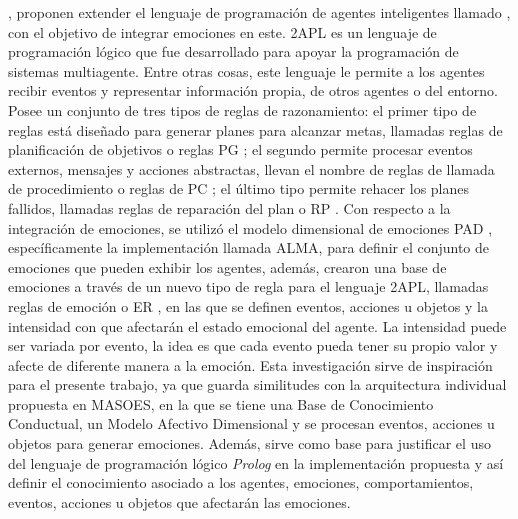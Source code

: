 \cite{dastani2014programming}, proponen extender el lenguaje de programación de agentes inteligentes llamado ,
con el objetivo de integrar emociones en este.
2APL es un lenguaje de programación lógico que fue desarrollado para apoyar la programación de sistemas multiagente.
Entre otras cosas, este lenguaje le permite a los agentes recibir eventos y representar información
propia, de otros agentes o del entorno.
Posee un conjunto de tres tipos de reglas de razonamiento:
el primer tipo de reglas está diseñado para generar planes para alcanzar metas,
llamadas reglas de planificación de objetivos o reglas PG ;
el segundo permite procesar eventos externos, mensajes y acciones abstractas,
llevan el nombre de reglas de llamada de procedimiento o reglas de PC ;
el último tipo permite rehacer los planes fallidos,
llamadas reglas de reparación del plan o RP .
Con respecto a la integración de emociones, se utilizó
el modelo dimensional de emociones PAD ,
específicamente la implementación llamada ALMA, para definir
el conjunto de emociones que pueden exhibir los agentes, además,
crearon una base de emociones a través de un nuevo tipo de regla para el lenguaje 2APL,
llamadas reglas de emoción o ER , en las que se definen eventos, acciones u objetos
y la intensidad con que afectarán el estado emocional del agente.
La intensidad puede ser variada por evento,
la idea es que cada evento pueda tener su propio valor
y afecte de diferente manera a la emoción.
Esta investigación sirve de inspiración para el presente trabajo,
ya que guarda similitudes con la arquitectura individual propuesta
en MASOES, en la que se tiene una Base de Conocimiento Conductual,
un Modelo Afectivo Dimensional y se procesan eventos, acciones u objetos para generar emociones.
Además, sirve como base para justificar el uso del
lenguaje de programación lógico \textit{Prolog} en la implementación
propuesta y así definir
el conocimiento asociado a los agentes, emociones,
comportamientos, eventos, acciones u objetos que afectarán las emociones.

